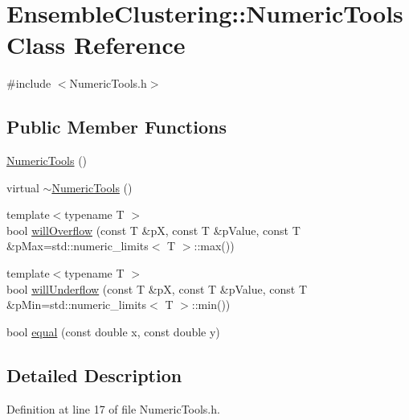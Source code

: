 \hypertarget{class_ensemble_clustering_1_1_numeric_tools}{\section{Ensemble\-Clustering\-:\-:Numeric\-Tools Class Reference}
\label{class_ensemble_clustering_1_1_numeric_tools}
}


{\ttfamily \#include $<$Numeric\-Tools.\-h$>$}

\subsection*{Public Member Functions}
\begin{DoxyCompactItemize}
\item 
\hyperlink{class_ensemble_clustering_1_1_numeric_tools_a6aecf10f3f25392a304d4875d2de66a0}{Numeric\-Tools} ()
\item 
virtual \hyperlink{class_ensemble_clustering_1_1_numeric_tools_af743974acde4e5009b26a2abaad8e8a7}{$\sim$\-Numeric\-Tools} ()
\item 
{\footnotesize template$<$typename T $>$ }\\bool \hyperlink{class_ensemble_clustering_1_1_numeric_tools_a7c88c3dbcf222ed8b37bcc927b7034c8}{will\-Overflow} (const T \&p\-X, const T \&p\-Value, const T \&p\-Max=std\-::numeric\-\_\-limits$<$ T $>$\-::max())
\item 
{\footnotesize template$<$typename T $>$ }\\bool \hyperlink{class_ensemble_clustering_1_1_numeric_tools_a3bf9deed8d1b5a712115189c3db559a2}{will\-Underflow} (const T \&p\-X, const T \&p\-Value, const T \&p\-Min=std\-::numeric\-\_\-limits$<$ T $>$\-::min())
\item 
bool \hyperlink{class_ensemble_clustering_1_1_numeric_tools_a5a67d7b898c9153c6e782160aff5fac2}{equal} (const double x, const double y)
\end{DoxyCompactItemize}


\subsection{Detailed Description}


Definition at line 17 of file Numeric\-Tools.\-h.



